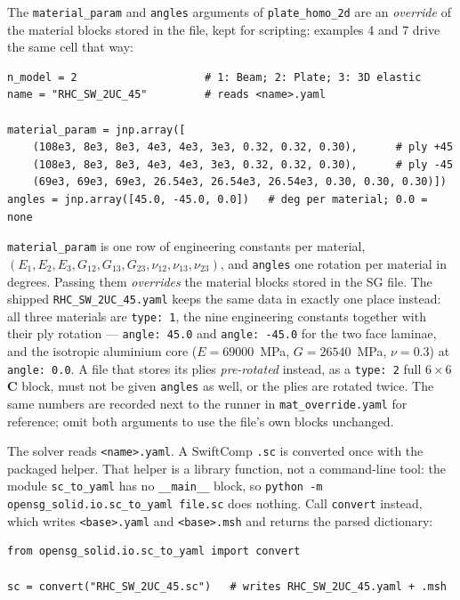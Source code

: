The \texttt{material\_param} and \texttt{angles} arguments of
\texttt{plate\_homo\_2d} are an \emph{override} of the material blocks stored
in the file, kept for scripting; examples 4 and 7 drive the same cell that way:

\begin{lstlisting}[style=opensg,caption={The material override block, as examples 4 and 7 carry it.}]
n_model = 2                    # 1: Beam; 2: Plate; 3: 3D elastic
name = "RHC_SW_2UC_45"         # reads <name>.yaml

material_param = jnp.array([
    (108e3, 8e3, 8e3, 4e3, 4e3, 3e3, 0.32, 0.32, 0.30),      # ply +45
    (108e3, 8e3, 8e3, 4e3, 4e3, 3e3, 0.32, 0.32, 0.30),      # ply -45
    (69e3, 69e3, 69e3, 26.54e3, 26.54e3, 26.54e3, 0.30, 0.30, 0.30)])
angles = jnp.array([45.0, -45.0, 0.0])   # deg per material; 0.0 = none
\end{lstlisting}

\texttt{material\_param} is one row of engineering constants per material,
$(E_1, E_2, E_3, G_{12}, G_{13}, G_{23}, \nu_{12}, \nu_{13}, \nu_{23})$, and
\texttt{angles} one rotation per material in degrees. Passing them
\emph{overrides} the material blocks stored in the SG file. The shipped
\texttt{RHC\_SW\_2UC\_45.yaml} keeps the same data in exactly one place
instead: all three materials are \texttt{type: 1}, the nine engineering
constants together with their ply rotation --- \texttt{angle: 45.0} and
\texttt{angle: -45.0} for the two face laminae, and the isotropic aluminium
core ($E = 69000$~MPa, $G = 26540$~MPa, $\nu = 0.3$) at \texttt{angle: 0.0}.
A file that stores its plies \emph{pre-rotated} instead, as a \texttt{type: 2}
full $6\times6$ $\mathbf{C}$ block, must not be given \texttt{angles} as well,
or the plies are rotated twice. The same numbers are recorded next to the
runner in \texttt{mat\_override.yaml} for reference; omit both arguments to use
the file's own blocks unchanged.

The solver reads \texttt{<name>.yaml}. A SwiftComp \texttt{.sc} is converted
once with the packaged helper. That helper is a library function, not a
command-line tool: the module \texttt{sc\_to\_yaml} has no \texttt{\_\_main\_\_}
block, so
\texttt{python -m opensg\_solid.io.sc\_to\_yaml file.sc}
does nothing. Call
\texttt{convert} instead, which writes \texttt{<base>.yaml} and
\texttt{<base>.msh} and returns the parsed dictionary:

\begin{lstlisting}[style=opensg,caption={Converting a SwiftComp .sc once.}]
from opensg_solid.io.sc_to_yaml import convert

sc = convert("RHC_SW_2UC_45.sc")   # writes RHC_SW_2UC_45.yaml + .msh
\end{lstlisting}

